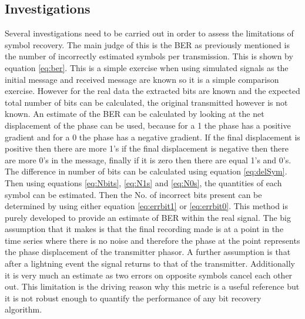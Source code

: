 \subsection{Investigations}\label{sec:investigations}
Several investigations need to be carried out in order to assess the limitations of symbol recovery. The main judge of this is the BER as previously mentioned is the number of incorrectly estimated symbols per transmission. This is shown by equation \ref{eq:ber}. This is a simple exercise when using simulated signals as the initial message and received message are known so it is a simple comparison exercise. However for the real data the extracted bits are known and the expected total number of bits can be calculated, the original transmitted however is not known. An estimate of the BER can be calculated by looking at the net displacement of the phase can be used, because for a 1 the phase has a positive gradient and for a 0 the phase has a negative gradient. If the final displacement is positive then there are more 1's if the final displacement is negative then there are more 0's in the message, finally if it is zero then there are equal 1's and 0's. The difference in number of bits can be calculated using equation \ref{eq:delSym}. Then using equations \ref{eq:Nbits}, \ref{eq:N1s} and \ref{eq:N0s}, the quantities of each symbol can be estimated. Then the No. of incorrect bits present can be determined by using either equation \ref{eq:errbit1} or \ref{eq:errbit0}. This method is purely developed to provide an estimate of BER within the real signal. The big assumption that it makes is that the final recording made is at a point in the time series where there is no noise and therefore the phase at the point represents the phase displacement of the transmitter phasor. A further assumption is that after a lightning event the signal returns to that of the transmitter. Additionally it is very much an estimate as two errors on opposite symbols cancel each other out. This limitation is the driving reason why this metric is a useful reference but it is not robust enough to quantify the performance of any bit recovery algorithm. 

